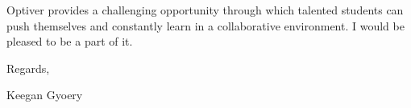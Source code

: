 \documentclass[a4paper,11pt]{article}
\begin{document}
Optiver provides a challenging opportunity through which talented students can push themselves
and constantly learn in a collaborative environment. I would be pleased to be a part of it. \par

Regards, \par

Keegan Gyoery
\end{document}
